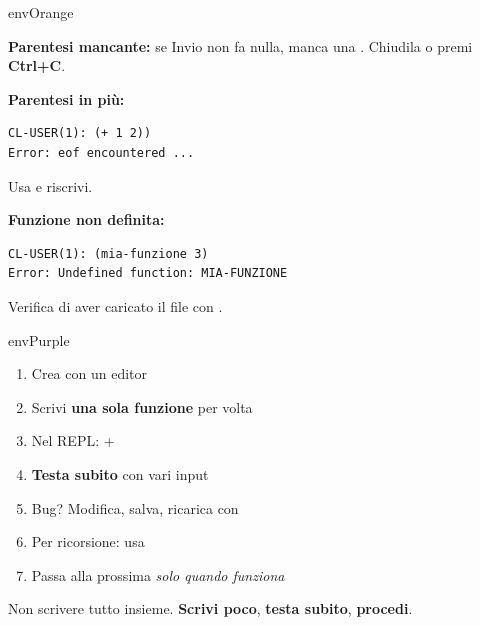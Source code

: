 
\begin{envbox}{envOrange}

\small\color{black!70}
\textbf{\textcolor{envOrange!80!black}{Parentesi mancante:}} se Invio non fa nulla, manca una \fn{)}.
Chiudila o premi \textbf{Ctrl+C}.
\color{black}

\smallskip
\small\color{black!70}
\textbf{\textcolor{envOrange!80!black}{Parentesi in più:}}\nopagebreak
\color{black}
\begin{lstlisting}
CL-USER(1): (+ 1 2))
Error: eof encountered ...
\end{lstlisting}
\small\color{black!70}
Usa  e riscrivi.
\color{black}

\smallskip
\small\color{black!70}
\textbf{\textcolor{envOrange!80!black}{Funzione non definita:}}\nopagebreak
\color{black}
\begin{lstlisting}
CL-USER(1): (mia-funzione 3)
Error: Undefined function: MIA-FUNZIONE
\end{lstlisting}
\small\color{black!70}
Verifica di aver caricato il file con .
\color{black}

\end{envbox}


\begin{envbox}{envPurple}

\small\color{black!70}
\begin{enumerate}[leftmargin=1.5em, itemsep=3pt, topsep=0pt]
  \item Crea  con un editor
  \item Scrivi \textbf{\textcolor{envPurple!80!black}{una sola funzione}} per volta
  \item Nel REPL:  + 
  \item \textbf{Testa subito} con vari input
  \item Bug? Modifica, salva, ricarica con 
  \item Per ricorsione: usa 
  \item Passa alla prossima \emph{solo quando funziona}
\end{enumerate}
\color{black}

\begin{tipbox}
Non scrivere tutto insieme. \textbf{Scrivi poco}, \textbf{testa subito}, \textbf{procedi}.
\end{tipbox}

\end{envbox}
